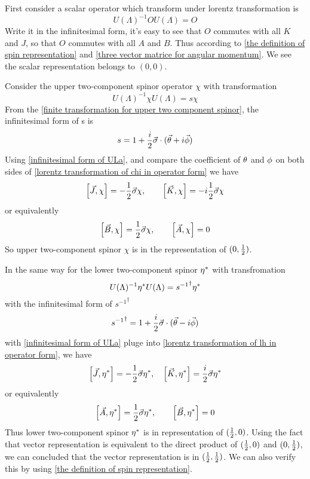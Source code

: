 First consider a scalar operator which transform under lorentz transformation is
\begin{equation}
U(\Lambda)^{-1} O U(\Lambda) = O 
\end{equation}
Write it in the infinitesimal form, it's easy to see that $O$ commutes with all $K$ and $J$, so that  $O$ commutes with all $A$ and $B$. Thus according to \eqref{the definition of spin representation} and \eqref{three vector matrice for angular momentum}. We see the scalar representation belongs to $(0,0)$.

Consider the upper two-component spinor operator $\chi$ with transformation
\begin{equation}\label{lorentz transformation of chi in operator form}
U(\Lambda)^{-1}\chi U(\Lambda) = s \chi
\end{equation} 
From the \eqref{finite transformation for upper two component spinor}, the infinitesimal form of s is
\begin{equation}
s = 1 + \frac{i}{2} \vec{\sigma}\cdot(\vec{\theta}+i\vec{\phi})
\end{equation}
Using \eqref{infinitesimal form of ULa}, and compare the coefficient of $\theta$ and $\phi$ on both sides of \eqref{lorentz transformation of chi in operator form} we have
\begin{equation}
\comm{\vec{J}}{\chi} = -\half \vec{\s}\chi,\qquad
\comm{\vec{K}}{\chi} = - i\half \vec{\s}\chi
\end{equation}
or equivalently
\begin{equation}
\comm{\vec{B}}{\chi} = \half \vec{\s}\chi,\qquad
\comm{\vec{A}}{\chi} =0
\end{equation}
So upper two-component spinor $\chi$ is in the representation of $(0,\frac{1}{2})$.

In the same way for the lower two-component spinor ${\eta^*}$ with transfromation
\begin{equation}\label{lorentz transformation of lh in operator form}
U(\Lambda)^{-1}{\eta^*} U(\Lambda) = {s^{-1}}^{\dagger} {\eta^*}
\end{equation}
with the infinitesimal form of ${s^{-1}}^{\dagger}$ 
\begin{equation}
{s^{-1}}^{\dagger} = 1 + \frac{i}{2}\vec{\sigma}\cdot(\vec{\theta}-i\vec{\phi})
\end{equation}
with \eqref{infinitesimal form of ULa} pluge into \eqref{lorentz transformation of lh in operator form}, we have
\begin{equation}
\comm{\vec{J}}{\lh}=-\half\vec{\s}\lh,\quad
\comm{\vec{K}}{\lh} = \frac{i}{2}\vec{\s}\lh
\end{equation}
or equivalently 
\begin{equation}
\comm{\vec{A}}{\lh} = \half \vec{\s}\lh,\qquad
\comm{\vec{B}}{\lh} =0
\end{equation}
Thus lower two-component spinor ${\eta^*}$ is in representation of $(\frac{1}{2},0)$.
Using the fact that vector representation is equivalent to the direct product of $(\frac{1}{2},0)$ and $(0,\frac{1}{2})$, we can concluded that the vector representation is in $(\frac{1}{2},\frac{1}{2})$. We can also verify this by using \eqref{the definition of spin representation}.

